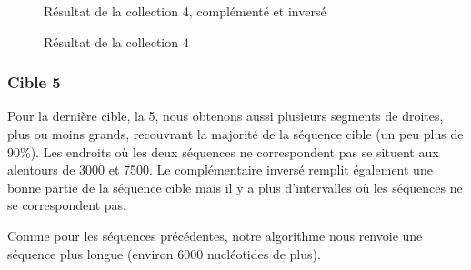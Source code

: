 \begin{figure}[!ht]
\begin{minipage}[c]{.46 \linewidth}
\begin{center}
			Résultat de la collection 4, complémenté et inversé
		\end{center}
	\end{minipage}
	\caption{Résultat de la collection 4}
\end{figure}

\FloatBarrier

\subsubsection*{Cible 5}

Pour la dernière cible, la 5, nous obtenons aussi plusieurs segments de droites,
plus ou moins grands, recouvrant la majorité de la séquence cible (un peu plus
de 90\%). Les endroits où les deux séquences ne correspondent pas se situent aux
alentours de 3000 et 7500. Le complémentaire inversé remplit également une bonne
partie de la séquence cible mais il y a plus d'intervalles où les séquences ne
se correspondent pas.

Comme pour les séquences précédentes, notre algorithme nous renvoie une séquence
plus longue (environ 6000 nucléotides de plus).

